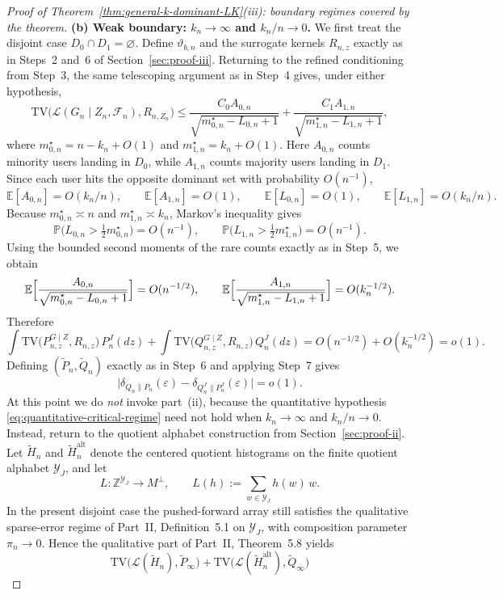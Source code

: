 \documentclass{article}
\newcommand{\TV}{\mathrm{TV}}
\newcommand{\E}{\mathbb E}
\newcommand{\Pbb}{\mathbb P}
\newcommand{\1}{\mathbf 1}
\begin{document}
\begin{proof}[Proof of Theorem~\ref{thm:general-k-dominant-LK}(iii): boundary regimes covered by the theorem]
\medskip
\textbf{(b) Weak boundary: $k_n\to\infty$ and $k_n/n\to 0$.}
We first treat the disjoint case $D_0\cap D_1=\varnothing$. Define $\vartheta_{b,n}$ and the surrogate kernels
$R_{n,z}$ exactly as in Steps~2 and~6 of Section~\ref{sec:proof-iii}. Returning to the refined conditioning from
Step~3, the same telescoping argument as in Step~4 gives, under either hypothesis,
\[
\TV\bigl(\mathcal L(G_n\mid Z_n,\mathcal F_n),R_{n,Z_n}\bigr)
\le
\frac{C_0A_{0,n}}{\sqrt{m_{0,n}^\star-L_{0,n}+1}}
+
\frac{C_1A_{1,n}}{\sqrt{m_{1,n}^\star-L_{1,n}+1}},
\]
where $m_{0,n}^\star=n-k_n+O(1)$ and $m_{1,n}^\star=k_n+O(1)$. Here $A_{0,n}$ counts minority users landing in
$D_0$, while $A_{1,n}$ counts majority users landing in $D_1$. Since each user hits the opposite dominant set with
probability $O(n^{-1})$,
\[
\E[A_{0,n}]=O(k_n/n),
\qquad
\E[A_{1,n}]=O(1),
\qquad
\E[L_{0,n}]=O(1),
\qquad
\E[L_{1,n}]=O(k_n/n).
\]
Because $m_{0,n}^\star\asymp n$ and $m_{1,n}^\star\asymp k_n$, Markov's inequality gives
\[
\Pbb\bigl(L_{0,n}>\tfrac12 m_{0,n}^\star\bigr)=O(n^{-1}),
\qquad
\Pbb\bigl(L_{1,n}>\tfrac12 m_{1,n}^\star\bigr)=O(n^{-1}).
\]
Using the bounded second moments of the rare counts exactly as in Step~5, we obtain
\[
\E\Bigl[\frac{A_{0,n}}{\sqrt{m_{0,n}^\star-L_{0,n}+1}}\Bigr]=O(n^{-1/2}),
\qquad
\E\Bigl[\frac{A_{1,n}}{\sqrt{m_{1,n}^\star-L_{1,n}+1}}\Bigr]=O(k_n^{-1/2}).
\]
Therefore
\[
\int \TV\bigl(P_{n,z}^{G\mid Z},R_{n,z}\bigr)\,P_n^J(dz)
+
\int \TV\bigl(Q_{n,z}^{G\mid Z},R_{n,z}\bigr)\,Q_n^J(dz)
=O(n^{-1/2})+O(k_n^{-1/2})=o(1).
\]
Defining $(\widetilde P_n,\widetilde Q_n)$ exactly as in Step~6 and applying Step~7 gives
\[
\bigl|\delta_{Q_n\|P_n}(\varepsilon)-\delta_{Q_n^J\|P_n^J}(\varepsilon)\bigr|=o(1).
\]
At this point we do \emph{not} invoke part~\textup{(ii)}, because the quantitative hypothesis
\eqref{eq:quantitative-critical-regime} need not hold when $k_n\to\infty$ and $k_n/n\to 0$. Instead, return to the
quotient alphabet construction from Section~\ref{sec:proof-ii}. Let $\widetilde H_n$ and $\widetilde H_n^{\mathrm{alt}}$
denote the centered quotient histograms on the finite quotient alphabet $\mathcal Y_J$, and let
\[
L:\mathbb Z^{\mathcal Y_J}\to M^\perp,
\qquad
L(h):=\sum_{w\in\mathcal Y_J} h(w)\,w.
\]
In the present disjoint case the pushed-forward array still satisfies the qualitative sparse-error regime of
Part~II, Definition~5.1 on $\mathcal Y_J$, with composition parameter $\pi_n\to 0$. Hence the qualitative part of
Part~II, Theorem~5.8 yields
\[
\TV\bigl(\mathcal L(\widetilde H_n),\widetilde P_\infty\bigr)
+
\TV\bigl(\mathcal L(\widetilde H_n^{\mathrm{alt}}),\widetilde Q_\infty\bigr)
\]
\end{proof}
\end{document}
